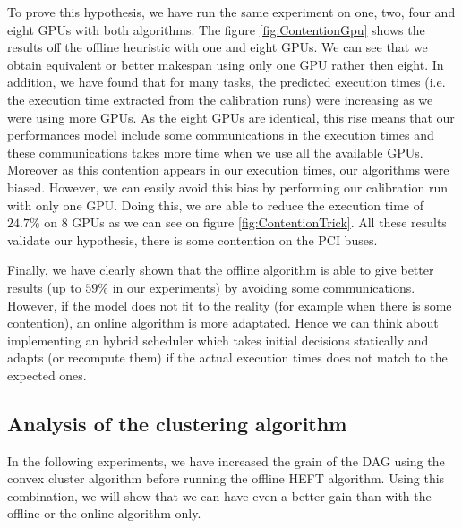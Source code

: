 \documentclass[10pt, conference, compsocconf,pdftex,dvipsnames]{IEEEtran}
\begin{document}
To prove this hypothesis, we have run the same experiment on one, two, four
and eight GPUs with both algorithms. The figure \ref{fig:ContentionGpu} shows
the results off the offline heuristic with one and eight GPUs. We can see that
we obtain equivalent or better makespan using only one GPU rather then eight.
In addition, we have found that for many tasks, the predicted execution times
(i.e. the execution time extracted from the calibration runs) were increasing
as we were using more GPUs. As the eight GPUs are identical, this rise means
that our performances model include some communications in the execution times
and these communications takes more time when we use all the available GPUs.
Moreover as this contention appears in our execution times, our algorithms
were biased. However, we can easily avoid this bias by performing our
calibration run with only one GPU. Doing this, we are able to reduce the
execution time of $24.7\%$ on 8 GPUs as we can see on figure
\ref{fig:ContentionTrick}. All these results validate our hypothesis, there is
some contention on the PCI buses.

Finally, we have clearly shown that the offline algorithm is able to give
better results (up to $59\%$ in our experiments) by avoiding some
communications. However, if the model does not fit to the reality (for example
when there is some contention), an online algorithm is more adaptated. Hence
we can think about implementing an hybrid scheduler which takes initial
decisions statically and adapts (or recompute them) if the actual execution
times does not match to the expected ones.

\subsection{Analysis of the clustering algorithm}
\label{sec:exp-exp-clust}

In the following experiments, we have increased the grain of the DAG using the
convex cluster algorithm before running the offline HEFT algorithm. Using this
combination, we will show that we can have even a better gain than with the
offline or the online algorithm only.
\end{document}

